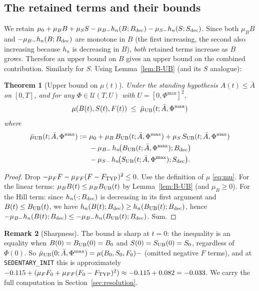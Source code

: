 \documentclass[11pt,a4paper]{article}
\newtheorem{theorem}{Theorem}
\theoremstyle{definition}
\newtheorem{remark}[theorem]{Remark}
\begin{document}
\subsection{The retained terms and their bounds}

We retain $\mu_0 + \mu_B B + \mu_S S - \mu_{B-} h_n(B; B_{\rm dec}) - \mu_{S-} h_n(S; S_{\rm dec})$. Since both $\mu_B B$ and $-\mu_{B-} h_n(B; B_{\rm dec})$ are monotone in $B$ (the first increasing, the second also increasing because $h_n$ is decreasing in $B$), \emph{both} retained terms increase as $B$ grows. Therefore an upper bound on $B$ gives an upper bound on the combined contribution. Similarly for $S$. Using Lemma~\ref{lem:B-UB} (and its $S$ analogue):

\begin{theorem}[Upper bound on $\mu(t)$] \label{thm:mu-upper-bound}
Under the standing hypothesis $A(t) \le \bar A$ on $[0,T]$, and for any $\Phi \in \mathcal{U}(T, U)$ with $U = [0, \Phi^{\max}]^2$,
\begin{equation}
\mu(B(t), S(t), F(t))
\;\le\;
\bar\mu_{\rm UB}(t; \bar A, \Phi^{\max})
\label{eq:mu-upper-bound}
\end{equation}
where
\begin{align}
\bar\mu_{\rm UB}(t; \bar A, \Phi^{\max}) :=\; & \mu_0 + \mu_B \, B_{\rm UB}(t; \bar A, \Phi^{\max}) + \mu_S \, S_{\rm UB}(t; \bar A, \Phi^{\max}) \notag \\
& - \mu_{B-} \, h_n\!\big(B_{\rm UB}(t; \bar A, \Phi^{\max}); B_{\rm dec}\big) \notag \\
& - \mu_{S-} \, h_n\!\big(S_{\rm UB}(t; \bar A, \Phi^{\max}); S_{\rm dec}\big).
\label{eq:mu-upper-bound-explicit}
\end{align}
\end{theorem}

\begin{proof}
Drop $-\mu_F F - \mu_{FF}(F-F_{\rm TYP})^2 \le 0$. Use the definition of $\mu$ \eqref{eq:mu}. For the linear terms: $\mu_B B(t) \le \mu_B B_{\rm UB}(t)$ by Lemma~\ref{lem:B-UB} (and $\mu_B \ge 0$). For the Hill term: since $h_n(\cdot; B_{\rm dec})$ is decreasing in its first argument and $B(t) \le B_{\rm UB}(t)$, we have $h_n(B(t); B_{\rm dec}) \ge h_n(B_{\rm UB}(t); B_{\rm dec})$, hence $-\mu_{B-} h_n(B(t); B_{\rm dec}) \le -\mu_{B-} h_n(B_{\rm UB}(t); B_{\rm dec})$. Sum.
\end{proof}

\begin{remark}[Sharpness]
The bound is sharp at $t=0$: the inequality is an equality when $B(0) = B_{\rm UB}(0) = B_0$ and $S(0) = S_{\rm UB}(0) = S_0$, regardless of $\Phi(0)$. So $\bar\mu_{\rm UB}(0; \bar A, \Phi^{\max}) = \mu(B_0, S_0, F_0) - $ (omitted negative $F$ terms), and at \texttt{SEDENTARY\_INIT} this is approximately $-0.115 + (\mu_F F_0 + \mu_{FF}(F_0 - F_{\rm TYP})^2) \approx -0.115 + 0.082 = -0.033$. We carry the full computation in Section~\ref{sec:resolution}.
\end{remark}
\end{document}
